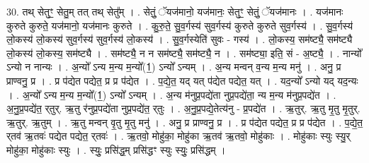 \documentclass[17pt]{extarticle}
\begin{document}
30. तथ् सेतुꣳ॒॒ सेतु॒म् तत् तथ् सेतु᳚म् । . सेतुं॒ ॅयज॑मानो॒ यज॑मानः॒ सेतुꣳ॒॒ सेतुं॒ ॅयज॑मानः । . यज॑मानः कुरुते कुरुते॒ यज॑मानो॒ यज॑मानः कुरुते । . कु॒रु॒ते॒ सु॒व॒र्गस्य॑ सुव॒र्गस्य॑ कुरुते कुरुते सुव॒र्गस्य॑ । . सु॒व॒र्गस्य॑ लो॒कस्य॑ लो॒कस्य॑ सुव॒र्गस्य॑ सुव॒र्गस्य॑ लो॒कस्य॑ । . सु॒व॒र्गस्येति॑ सुवः - गस्य॑ । . लो॒कस्य॒ सम॑ष्ट्यै॒ सम॑ष्ट्यै लो॒कस्य॑ लो॒कस्य॒ सम॑ष्ट्यै । . सम॑ष्ट्यै॒ न न सम॑ष्ट्यै॒ सम॑ष्ट्यै॒ न । . सम॑ष्ट्या॒ इति॒ सं - अ॒ष्ट्यै॒ । . नान्यो᳚ ऽन्यो न नान्यः । . अ॒न्यो᳚ ऽन्य म॒न्य म॒न्यो᳚(1॒) ऽन्यो᳚ ऽन्यम् । . अ॒न्य मन्वन् व॒न्य म॒न्य मनु॑ । . अनु॒ प्र प्राण्वनु॒ प्र । . प्र प॑द्येत पद्येत॒ प्र प्र प॑द्येत । . प॒द्ये॒त॒ यद् यत् प॑द्येत पद्येत॒ यत् । . यद॒न्यो᳚ ऽन्यो यद् यद॒न्यः । . अ॒न्यो᳚ ऽन्य म॒न्य म॒न्यो᳚(1॒) ऽन्यो᳚ ऽन्यम् । . अ॒न्य म॑नुप्र॒पद्ये॑ता नुप्र॒पद्ये॑ता॒ न्य म॒न्य म॑नुप्र॒पद्ये॑त । . अ॒नु॒प्र॒पद्ये॑त॒ र्‌तुर्. ऋ॒तु र॑नुप्र॒पद्ये॑ता नुप्र॒पद्ये॑त॒ र्‌तुः । . अ॒नु॒प्र॒पद्ये॒तेत्य॑नु - प्र॒पद्ये॑त । . ऋ॒तुर्. ऋ॒तु मृ॒तु मृ॒तुर्. ऋ॒तुर्. ऋ॒तुम् । . ऋ॒तु मन्वन् वृ॒तु मृ॒तु मनु॑ । . अनु॒ प्र प्राण्वनु॒ प्र । . प्र प॑द्येत पद्येत॒ प्र प्र प॑द्येत । . प॒द्ये॒त॒ र्‌तव॑ ऋ॒तवः॑ पद्येत पद्येत॒ र्‌तवः॑ । . ऋ॒तवो॒ मोहु॑का॒ मोहु॑का ऋ॒तव॑ ऋ॒तवो॒ मोहु॑काः । . मोहु॑काः स्युः स्यु॒र् मोहु॑का॒ मोहु॑काः स्युः । . स्युः॒ प्रसि॑द्ध॒म् प्रसि॑द्धꣳ स्युः स्युः॒ प्रसि॑द्धम् । \newline
\end{document}

